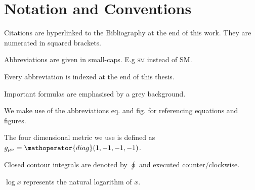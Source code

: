 \documentclass[../../index.tex]{subfiles}
\begin{document}
\chapter*{Notation and Conventions}

Citations are hyperlinked to the Bibliography at the end of this work. They are
numerated in squared brackets. \vspace{0.3cm}

Abbreviations are given in small-caps. E.g \textsc{sm} instead of SM.
\vspace{0.3cm}

Every abbreviation is indexed at the end of this thesis. \vspace{0.3cm}

Important formulas are emphasised by a grey background. \vspace{0.3cm}

We make use of the abbreviations eq. and fig. for referencing equations and
figures. \vspace{0.3cm}

The four dimensional metric we use is defined as \(g_{\mu\nu} =
\mathoperator{diag}(1, -1, -1, -1)\). \vspace{0.3cm}

Closed contour integrals are denoted by \(\oint\) and executed
counter\-/clockwise. \vspace{0.3cm}

\(\log x\) represents the natural logarithm of \(x\).
\end{document}
